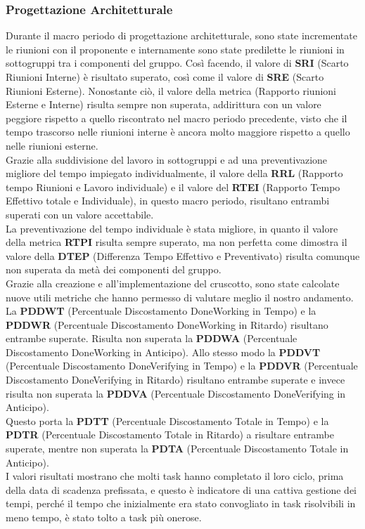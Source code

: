 \subsubsection{Progettazione Architetturale}
Durante il macro periodo di progettazione architetturale, sono state incrementate le riunioni con il proponente e internamente sono state predilette le riunioni in sottogruppi tra i componenti del gruppo. Così facendo,
il valore di \textbf{SRI} (Scarto Riunioni Interne) è risultato superato, così come il valore di \textbf{SRE} (Scarto Riunioni Esterne). Nonostante ciò, il valore della metrica (Rapporto riunioni Esterne e Interne) risulta sempre non superata, addirittura con un valore peggiore rispetto a quello riscontrato nel macro periodo precedente, visto che il tempo trascorso nelle riunioni interne è ancora molto maggiore rispetto a quello nelle riunioni esterne.\\
Grazie alla suddivisione del lavoro in sottogruppi e ad una preventivazione migliore del tempo impiegato individualmente, il valore della \textbf{RRL} (Rapporto tempo Riunioni e Lavoro individuale) e il valore del \textbf{RTEI} (Rapporto Tempo Effettivo totale e Individuale), in questo macro periodo, risultano entrambi superati con un valore accettabile. \\
La preventivazione del tempo individuale è stata migliore, in quanto il valore della metrica \textbf{RTPI} risulta sempre superato, ma non perfetta come dimostra il valore della \textbf{DTEP} (Differenza Tempo Effettivo e Preventivato) risulta comunque non superata da metà dei componenti del gruppo.\\
Grazie alla creazione e all'implementazione del cruscotto, sono state calcolate nuove utili metriche che hanno permesso di valutare meglio il nostro andamento. \\
La \textbf{PDDWT} (Percentuale Discostamento DoneWorking in Tempo) e la \textbf{PDDWR} (Percentuale Discostamento DoneWorking in Ritardo) risultano entrambe superate. Risulta non superata la \textbf{PDDWA} (Percentuale Discostamento DoneWorking in Anticipo). Allo stesso modo la \textbf{PDDVT} (Percentuale Discostamento DoneVerifying in Tempo) e la \textbf{PDDVR} (Percentuale Discostamento DoneVerifying in Ritardo) risultano entrambe superate e invece risulta non superata la \textbf{PDDVA} (Percentuale Discostamento DoneVerifying in Anticipo). \\ Questo porta la \textbf{PDTT} (Percentuale Discostamento Totale in Tempo) e la \textbf{PDTR} (Percentuale Discostamento Totale in Ritardo) a risultare entrambe superate, mentre non superata la \textbf{PDTA} (Percentuale Discostamento Totale in Anticipo).\\ I valori risultati mostrano che molti task hanno completato il loro ciclo, prima della data di scadenza prefissata, e questo è indicatore di una cattiva gestione dei tempi, perché il tempo che inizialmente era stato convogliato in task risolvibili in meno tempo, è stato tolto a task più onerose.\\

